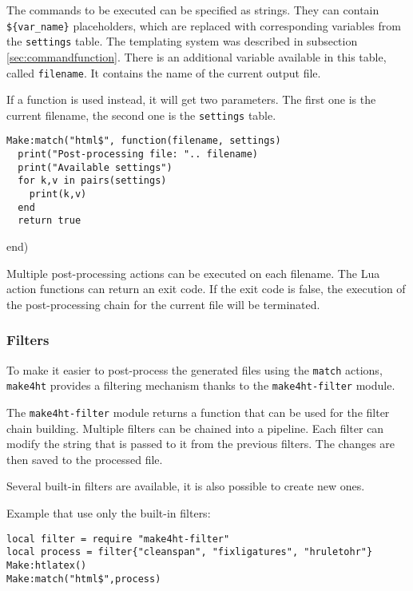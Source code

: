The commands to be executed can be specified as strings. They can
contain \texttt{\$\{var\_name\}} placeholders, which are replaced with
corresponding variables from the \texttt{settings} table. The templating
system was described in subsection \ref{sec:commandfunction}. There is
an additional variable available in this table, called
\texttt{filename}. It contains the name of the current output file.

If a function is used instead, it will get two parameters. The first one
is the current filename, the second one is the \texttt{settings} table.

\begin{verbatim}
Make:match("html$", function(filename, settings)
  print("Post-processing file: ".. filename)
  print("Available settings")
  for k,v in pairs(settings)
    print(k,v)
  end
  return true
\end{verbatim}

end)

Multiple post-processing actions can be executed on each filename. The
Lua action functions can return an exit code. If the exit code is false,
the execution of the post-processing chain for the current file will be
terminated.

\hypertarget{filters}{%
\subsubsection{Filters}\label{filters}}

\label{sec:filters}

To make it easier to post-process the generated files using the
\texttt{match} actions, \texttt{make4ht} provides a filtering mechanism
thanks to the \texttt{make4ht-filter} module.

The \texttt{make4ht-filter} module returns a function that can be used
for the filter chain building. Multiple filters can be chained into a
pipeline. Each filter can modify the string that is passed to it from
the previous filters. The changes are then saved to the processed file.

Several built-in filters are available, it is also possible to create
new ones.

Example that use only the built-in filters:

\begin{verbatim}
local filter = require "make4ht-filter"
local process = filter{"cleanspan", "fixligatures", "hruletohr"}
Make:htlatex()
Make:match("html$",process)
\end{verbatim}

